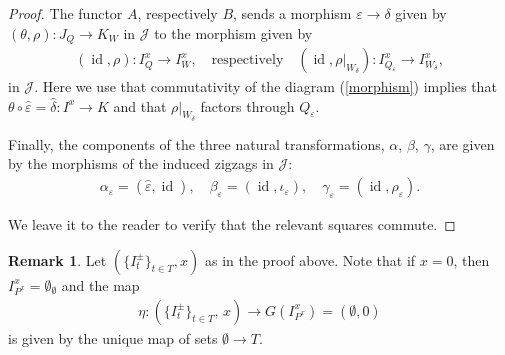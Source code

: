 \documentclass[12pt, reqno]{amsart}
\theoremstyle{plain}
\theoremstyle{definition}
\newtheorem{remark}[theorem]{Remark}
\renewcommand{\epsilon}{\varepsilon}
\begin{document}
\begin{proof}
The functor $A$, respectively $B$, sends a morphism $\epsilon\rightarrow \delta$ given by $(\theta, \rho)\colon J_Q\rightarrow K_W$ in $\mathcal{J}$ to the morphism given by
\begin{align*}
(\operatorname{id},\rho)\colon I^x_Q\rightarrow I^x_W,\quad \text{respectively}\quad (\operatorname{id},\rho\vert_{W_\delta})\colon I^x_{Q_\epsilon}\rightarrow I^x_{W_\delta},
\end{align*}
in $\mathcal{J}$. Here we use that commutativity of the diagram (\ref{morphism}) implies that $\theta\circ \hat{\epsilon} = \hat{\delta}\colon I^x\rightarrow K$ and that $\rho\vert_{W_\delta}$ factors through $Q_\epsilon$.

Finally, the components of the three natural transformations, $\alpha$, $\beta$, $\gamma$, are given by the morphisms of the induced zigzags in $\mathcal{J}$:
\begin{align*}
\alpha_\epsilon = (\hat{\epsilon}, \operatorname{id}),\quad \beta_\epsilon=(\operatorname{id},\iota_\epsilon),\quad \gamma_\epsilon=(\operatorname{id},\rho_\epsilon).
\end{align*}

We leave it to the reader to verify that the relevant squares commute.
\end{proof}

\begin{remark}
Let $(\{I_t^\pm\}_{t\in T},x)$ as in the proof above. Note that if $x=0$, then $I^x_{P^x}=\emptyset_\emptyset$ and the map
\begin{align*}
\eta\colon (\{I_t^\pm\}_{t\in T}, \,x)\rightarrow G(I^x_{P^x})=(\emptyset,0)
\end{align*}
is given by the unique map of sets $\emptyset\rightarrow T$.
\end{remark}
\end{document}
